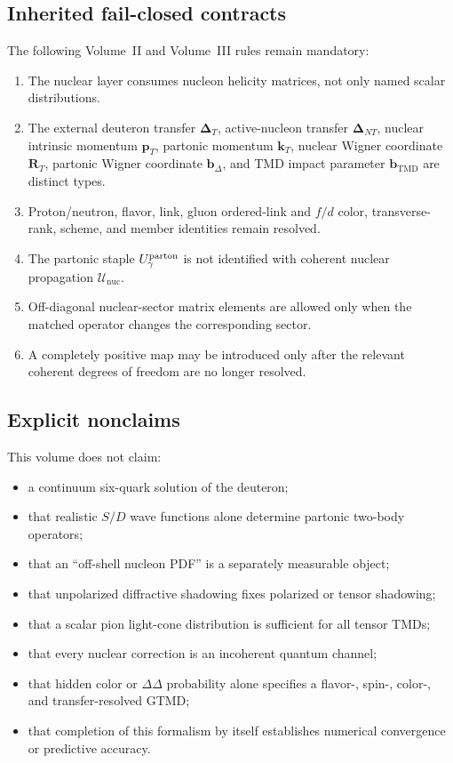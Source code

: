 \documentclass[11pt]{article}
\newcommand{\kT}{\bm{k}_{T}}
\newcommand{\pT}{\bm{p}_{T}}
\newcommand{\DT}{\bm{\Delta}_{T}}
\newcommand{\DNT}{\bm{\Delta}_{N T}}
\newcommand{\bD}{\bm{b}_{\Delta}}
\newcommand{\bM}{\bm{b}_{\mathrm{TMD}}}
\newcommand{\RT}{\bm{R}_{T}}
\newcommand{\cU}{\mathcal U}
\newcommand{\nuc}{\mathrm{nuc}}
\begin{document}
\subsection{Inherited fail-closed contracts}

The following Volume~II and Volume~III rules remain mandatory:
\begin{enumerate}
\item The nuclear layer consumes nucleon helicity matrices, not only named
      scalar distributions.
\item The external deuteron transfer \(\DT\), active-nucleon transfer
      \(\DNT\), nuclear intrinsic momentum \(\pT\), partonic momentum \(\kT\),
      nuclear Wigner coordinate \(\RT\), partonic Wigner coordinate \(\bD\),
      and TMD impact parameter \(\bM\) are distinct types.
\item Proton/neutron, flavor, link, gluon ordered-link and \(f/d\) color,
      transverse-rank, scheme, and member identities remain resolved.
\item The partonic staple \(U_\gamma^{\rm parton}\) is not identified with
      coherent nuclear propagation \(\cU_{\nuc}\).
\item Off-diagonal nuclear-sector matrix elements are allowed only when the
      matched operator changes the corresponding sector.
\item A completely positive map may be introduced only after the relevant
      coherent degrees of freedom are no longer resolved.
\end{enumerate}

\subsection{Explicit nonclaims}

This volume does not claim:
\begin{itemize}
\item a continuum six-quark solution of the deuteron;
\item that realistic \(S/D\) wave functions alone determine partonic
      two-body operators;
\item that an ``off-shell nucleon PDF'' is a separately measurable object;
\item that unpolarized diffractive shadowing fixes polarized or tensor
      shadowing;
\item that a scalar pion light-cone distribution is sufficient for all
      tensor TMDs;
\item that every nuclear correction is an incoherent quantum channel;
\item that hidden color or \(\Delta\Delta\) probability alone specifies a
      flavor-, spin-, color-, and transfer-resolved GTMD;
\item that completion of this formalism by itself establishes numerical
      convergence or predictive accuracy.
\end{itemize}
\end{document}
